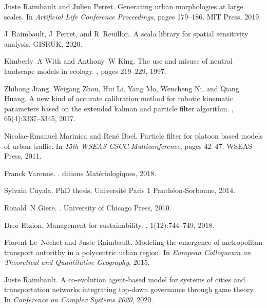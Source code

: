 \begin{thebibliography}{10}
Juste Raimbault and Julien Perret.
\newblock Generating urban morphologies at large scales.
\newblock In {\em Artificial Life Conference Proceedings}, pages 179--186. MIT
  Press, 2019.

J~Raimbault, J~Perret, and R~Reuillon.
\newblock A scala library for spatial sensitivity analysis.
\newblock GISRUK, 2020.

Kimberly~A With and Anthony~W King.
\newblock The use and misuse of neutral landscape models in ecology.
, pages 219--229, 1997.

Zhihong Jiang, Weigang Zhou, Hui Li, Yang Mo, Wencheng Ni, and Qiang Huang.
\newblock A new kind of accurate calibration method for robotic kinematic
  parameters based on the extended kalman and particle filter algorithm.
, 65(4):3337--3345,
  2017.

Nicolae-Emanuel Marinica and Ren{\'e} Boel.
\newblock Particle filter for platoon based models of urban traffic.
\newblock In {\em 15th WSEAS CSCC Multiconference}, pages 42--47. WSEAS Press,
  2011.

Franck Varenne.
.
ditions Mat{\'e}riologiques, 2018.

Sylvain Cuyala.
\newblock PhD thesis, Universit{\'e} Paris 1 Panth{\'e}on-Sorbonne, 2014.

Ronald~N Giere.
.
\newblock University of Chicago Press, 2010.

Dror Etzion.
\newblock Management for sustainability.
, 1(12):744--749, 2018.

Florent Le~N{\'e}chet and Juste Raimbault.
\newblock Modeling the emergence of metropolitan transport autorithy in a
  polycentric urban region.
\newblock In {\em European Colloqueum on Theoretical and Quantitative
  Geography}, 2015.

Juste Raimbault.
\newblock A co-evolution agent-based model for systems of cities and
  transportation networks integrating top-down governance through game theory.
\newblock In {\em Conference on Complex Systems 2020}, 2020.


\end{thebibliography}

